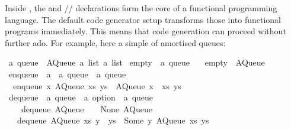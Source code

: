 \begin{isabellebody}
\begin{isamarkuptext}
  Inside \hyperlink{theory.HOL}{\mbox{}}, the \hyperlink{command.datatype}{\mbox{}} and
  \hyperlink{command.definition}{\mbox{}}/\hyperlink{command.primrec}{\mbox{}}/\hyperlink{command.fun}{\mbox{}} declarations form
  the core of a functional programming language.  The default code generator setup
   transforms those into functional programs immediately.
  This means that  code generation can proceed without further ado.
  For example, here a simple  of amortised queues:%
\end{isamarkuptext}%
\isamarkuptrue%
%
\isadelimquote
%
\endisadelimquote
%
\isatagquote
{}\isamarkupfalse%
\ {\isacharprime}a\ queue\ {\isacharequal}\ AQueue\ {\isachardoublequoteopen}{\isacharprime}a\ list{\isachardoublequoteclose}\ {\isachardoublequoteopen}{\isacharprime}a\ list{\isachardoublequoteclose}\isanewline
\isanewline
{}\isamarkupfalse%
\ empty\ {\isacharcolon}{\isacharcolon}\ {\isachardoublequoteopen}{\isacharprime}a\ queue{\isachardoublequoteclose}\ \isanewline
\ \ {\isachardoublequoteopen}empty\ {\isacharequal}\ AQueue\ {\isacharbrackleft}{\isacharbrackright}\ {\isacharbrackleft}{\isacharbrackright}{\isachardoublequoteclose}\isanewline
\isanewline
{}\isamarkupfalse%
\ enqueue\ {\isacharcolon}{\isacharcolon}\ {\isachardoublequoteopen}{\isacharprime}a\ {\isasymRightarrow}\ {\isacharprime}a\ queue\ {\isasymRightarrow}\ {\isacharprime}a\ queue{\isachardoublequoteclose}\ \isanewline
\ \ {\isachardoublequoteopen}enqueue\ x\ {\isacharparenleft}AQueue\ xs\ ys{\isacharparenright}\ {\isacharequal}\ AQueue\ {\isacharparenleft}x\ {\isacharhash}\ xs{\isacharparenright}\ ys{\isachardoublequoteclose}\isanewline
\isanewline
{}\isamarkupfalse%
\ dequeue\ {\isacharcolon}{\isacharcolon}\ {\isachardoublequoteopen}{\isacharprime}a\ queue\ {\isasymRightarrow}\ {\isacharprime}a\ option\ {\isasymtimes}\ {\isacharprime}a\ queue{\isachardoublequoteclose}\ \isanewline
\ \ \ \ {\isachardoublequoteopen}dequeue\ {\isacharparenleft}AQueue\ {\isacharbrackleft}{\isacharbrackright}\ {\isacharbrackleft}{\isacharbrackright}{\isacharparenright}\ {\isacharequal}\ {\isacharparenleft}None{\isacharcomma}\ AQueue\ {\isacharbrackleft}{\isacharbrackright}\ {\isacharbrackleft}{\isacharbrackright}{\isacharparenright}{\isachardoublequoteclose}\isanewline
\ \ {\isacharbar}\ {\isachardoublequoteopen}dequeue\ {\isacharparenleft}AQueue\ xs\ {\isacharparenleft}y\ {\isacharhash}\ ys{\isacharparenright}{\isacharparenright}\ {\isacharequal}\ {\isacharparenleft}Some\ y{\isacharcomma}\ AQueue\ xs\ ys{\isacharparenright}{\isachardoublequoteclose}\isanewline

\end{isabellebody}
